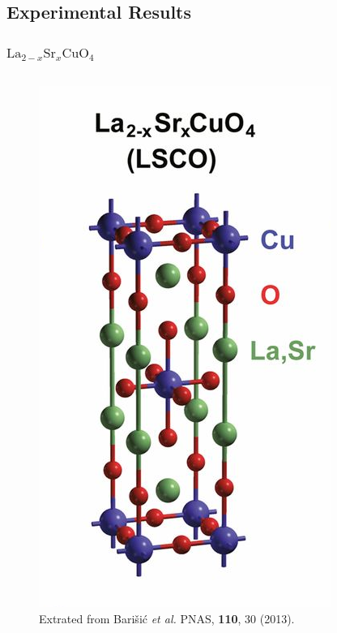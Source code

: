 \documentclass[10pt,aspectratio=43,xcolor=x11names,t]{beamer}%
\begin{document}
\begin{frame}
\begin{columns}
\begin{column}{0.4\textwidth}
\begin{figure}[!htp]
					\end{figure}
				\end{column}
			\end{columns}
		\end{frame}

	\subsection{Experimental Results}
		\begin{frame}\frametitle{$\mathrm{La}_{2-x}\mathrm{Sr}_x\mathrm{CuO}_4$}
			\begin{columns}
				\begin{column}{0.45\textwidth}
					\begin{figure}[!htp]
						\centering
						\includegraphics[scale=1]{SC.png}
						\caption{Extrated from {\scriptsize Barišić \textit{et al.} PNAS, \textbf{110}, 30 (2013)}.}

\end{figure}
\end{column}
\end{columns}
\end{frame}
\end{document}
